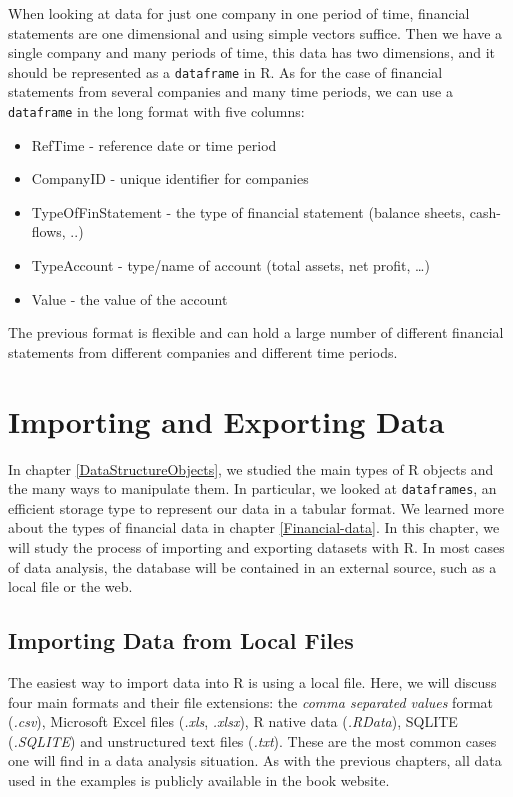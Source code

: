 \documentclass[11pt,]{book}
\providecommand{\tightlist}{%
  \setlength{\itemsep}{0pt}\setlength{\parskip}{0pt}}
\begin{document}
When looking at data for just one company in one period of time,
financial statements are one dimensional and using simple vectors
suffice. Then we have a single company and many periods of time, this
data has two dimensions, and it should be represented as a
\texttt{dataframe} in R. As for the case of financial statements from
several companies and many time periods, we can use a \texttt{dataframe}
in the long format with five columns:

\begin{itemize}
\tightlist
\item
  RefTime - reference date or time period
\item
  CompanyID - unique identifier for companies
\item
  TypeOfFinStatement - the type of financial statement (balance sheets,
  cash-flows, ..)
\item
  TypeAccount - type/name of account (total assets, net profit,
  \ldots{})
\item
  Value - the value of the account
\end{itemize}

The previous format is flexible and can hold a large number of different
financial statements from different companies and different time
periods.

\chapter{Importing and Exporting Data}\label{importing}

In chapter \ref{DataStructureObjects}, we studied the main types of R
objects and the many ways to manipulate them. In particular, we looked
at \texttt{dataframes}, an efficient storage type to represent our data
in a tabular format. We learned more about the types of financial data
in chapter \ref{Financial-data}. In this chapter, we will study the
process of importing and exporting datasets with R. In most cases of
data analysis, the database will be contained in an external source,
such as a local file or the web.

\section{Importing Data from Local
Files}\label{importing-data-from-local-files}

The easiest way to import data into R is using a local file. Here, we
will discuss four main formats and their file extensions: the
\emph{comma separated values} format (\emph{.csv}), Microsoft Excel
files (\emph{.xls}, \emph{.xlsx}), R native data (\emph{.RData}), SQLITE
(\emph{.SQLITE}) and unstructured text files (\emph{.txt}). These are
the most common cases one will find in a data analysis situation. As
with the previous chapters, all data used in the examples is publicly
available in the book website.
\end{document}
